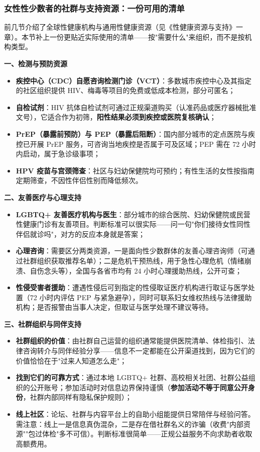 \subsubsection{女性性少数者的社群与支持资源：一份可用的清单}

前几节介绍了全球性健康机构与通用性健康资源（见《性健康资源与支持》一章）。本节补上一份更贴近实际使用的清单——按"需要什么"来组织，而不是按机构类型。

\textbf{一、检测与预防资源}
\begin{itemize}
\item \textbf{疾控中心（CDC）自愿咨询检测门诊（VCT）}：多数城市疾控中心及其指定的社区组织提供 HIV、梅毒等项目的免费或低成本检测，部分可匿名；
\item \textbf{自检试剂}：HIV 抗体自检试剂可通过正规渠道购买（认准药品或医疗器械批准文号），它适合作为初筛，\textbf{阳性结果必须到疾控或医院复核确认}；
\item \textbf{PrEP（暴露前预防）与 PEP（暴露后阻断）}：国内部分城市的定点医院与疾控已开展 PrEP 服务，可咨询当地疾控是否属于可及区域；PEP 需在 72 小时内启动，属于急诊级事项；
\item \textbf{HPV 疫苗与宫颈筛查}：社区与妇幼保健院均可预约；有性生活的女性按指南定期筛查，不因性伴侣性别而降低频次。
\end{itemize}

\textbf{二、友善医疗与心理支持}
\begin{itemize}
\item \textbf{LGBTQ+ 友善医疗机构与医生}：部分城市的综合医院、妇幼保健院或民营性健康门诊有友善项目。判断标准可以很实际——问一句"你们接待女性同性伴侣就诊吗"，对方的反应本身就是答案；
\item \textbf{心理咨询}：需要区分两类资源，一是面向性少数群体的友善心理咨询师（可通过社群组织获取推荐名单）；二是危机干预热线，用于急性心理危机（情绪崩溃、自伤念头等），全国与各省市均有 24 小时心理援助热线，公开可查；
\item \textbf{性侵受害者援助}：遭遇性侵后可到指定的性侵取证医疗机构进行取证与医学处置（72 小时内评估 PEP 与紧急避孕），同时可联系妇女维权热线与法律援助机构；是否报警由当事人决定，但取证与医学处理不建议等待。
\end{itemize}

\textbf{三、社群组织与同伴支持}
\begin{itemize}
\item \textbf{社群组织的价值}：由社群自己运营的组织通常能提供医院清单、体检指引、法律咨询转介与同伴经验分享——信息不一定都能在公开渠道找到，因为它们的价值恰恰在于"过来人知道怎么走"；
\item \textbf{找到它们的可靠方式}：通过本地 LGBTQ+ 社群、高校相关社团、社群公益组织的公开账号；参加活动时对信息边界保持谨慎（\textbf{参加活动不等于同意公开身份}，社群内部同样有隐私保护规则）；
\item \textbf{线上社区}：论坛、社群与内容平台上的自助小组能提供日常陪伴与经验问答。需注意：线上一是信息真伪混杂，二是存在借社群名义的诈骗（收费"内部资源""包过体检"多不可信）。判断标准很简单——正规公益服务不向求助者收取高额费用。
\end{itemize}

